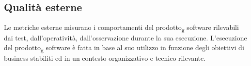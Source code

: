 \subsection{Qualità esterne}
Le metriche esterne misurano i comportamenti del prodotto\textsubscript{g} software rilevabili dai test, dall'operatività, dall'osservazione durante la sua esecuzione. L'esecuzione del prodotto\textsubscript{g} software è fatta in base al suo utilizzo in funzione degli obiettivi di business stabiliti ed in un contesto organizzativo e tecnico rilevante.
